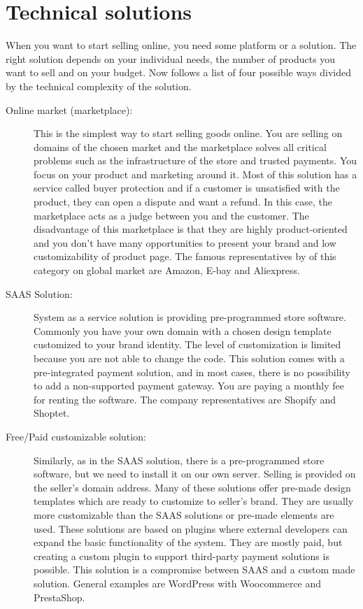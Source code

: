 \documentclass[thesis=M,english]{FITthesis}[2019/12/23]
\begin{document}
\section{Technical solutions}
When you want to start selling online, you need some platform or a solution. The right solution depends on your individual needs, the number of products you want to sell and on your budget. Now follows a list of four possible ways divided by the technical complexity of the solution.

\begin{description}

\item[Online market (marketplace):] This is the simplest way to start selling goods online. You are selling on domains of the chosen market and the marketplace solves all critical problems such as the infrastructure of the store and trusted payments. You focus on your product and marketing around it. Most of this solution has a service called buyer protection and if a customer is unsatisfied with the product, they can open a dispute and want a refund. In this case, the marketplace acts as a judge between you and the customer. 
The disadvantage of this marketplace is that they are highly product-oriented and you don't have many opportunities to present your brand and low customizability of product page.
The famous representatives by \cite{similarWebMarketplace} of this category on global market are Amazon, E-bay and Aliexpress.

\item[SAAS Solution:] System as a service solution is providing pre-programmed store software. Commonly you have your own domain with a chosen design template customized to your brand identity. The level of customization is limited because you are not able to change the code. This solution comes with a pre-integrated payment solution, and in most cases, there is no possibility to add a non-supported payment gateway. You are paying a monthly fee for renting the software.
The company representatives are Shopify and Shoptet.

\item[Free/Paid customizable solution:]
Similarly, as in the SAAS solution, there is a pre-programmed store software, but we need to install it on our own server. Selling is provided on the seller's domain address. Many of these solutions offer pre-made design templates which are ready to customize to seller's brand. They are usually more customizable than the SAAS solutions or pre-made elements are used. These solutions are based on plugins where external developers can expand the basic functionality of the system. They are mostly paid, but creating a custom plugin to support third-party payment solutions is possible.
This solution is a compromise between SAAS and a custom made solution.
General examples are WordPress with Woocommerce and PrestaShop.


\end{description}
\end{document}
